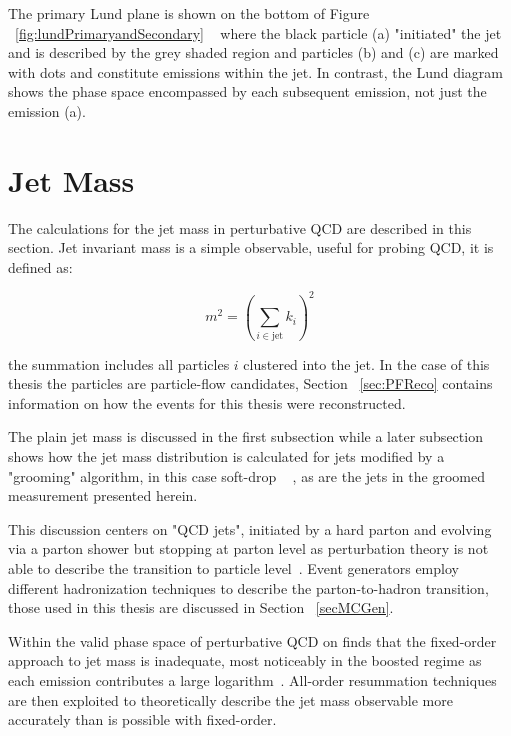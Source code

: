 The primary Lund plane is shown on the bottom of Figure ~\ref{fig:lundPrimaryandSecondary} ~\cite{Dreyer:2018nbf} where the black particle (a) "initiated" the jet and is described by the grey shaded region and particles (b) and (c) are marked with dots and constitute emissions within the jet. In contrast, the Lund diagram shows the phase space encompassed by each subsequent emission, not just the emission (a).~\cite{Dreyer:2018nbf}






\section{Jet Mass}\label{sec:jetmass}


The calculations for the jet mass in perturbative QCD are described in this section. Jet invariant mass is a simple observable, useful for probing QCD, it is defined as:\newline

\begin{equation}
m^{2}=\left(\sum_{i \in \mathrm{jet}} k_{i}\right)^{2}
\end{equation}

the summation includes all particles $i$ clustered into the jet. In the case of this thesis the particles are particle-flow candidates, Section ~\ref{sec:PFReco} contains information on how the events for this thesis were reconstructed.

The plain jet mass is discussed in the first subsection while a later subsection shows how the jet mass distribution is calculated for jets modified by a "grooming" algorithm, in this case soft-drop ~\cite{softdrop} , as are the jets in the groomed measurement presented herein.

This discussion centers on "QCD jets", initiated by a hard parton and evolving via a parton shower but stopping at parton level as perturbation theory is not able to describe the transition to particle level~\cite{Marzani:2019hun}. Event generators employ different hadronization techniques to describe the parton-to-hadron transition, those used in this thesis are discussed in Section ~\ref{secMCGen}.

Within the valid phase space of perturbative QCD on finds that the fixed-order approach to jet mass is inadequate, most noticeably in the boosted regime as each emission contributes a large logarithm~\cite{Marzani:2019hun}. All-order resummation techniques are then exploited to theoretically describe the jet mass observable more accurately than is possible with fixed-order. 



